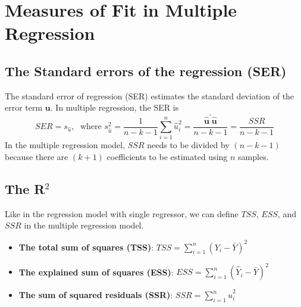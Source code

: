 \documentclass[a4paper,11pt]{article}
\begin{document}
\section{Measures of Fit in Multiple Regression}
\label{sec:org6b35845}
\subsection{The Standard errors of the regression (SER)}
\label{sec:orgfeeff00}
The standard error
of regression (SER) estimates the standard deviation of the error term
\(\mathbf{u}\). In multiple regression, the SER is
\begin{equation}
\label{eq:ser-m}
SER = s_{\hat{u}},\; \text{ where } s^2_{\hat{u}} = \frac{1}{n-k-1} \sum_{i=1}^n \hat{u}_i^2 =\frac{\mathbf{\hat{u}}^{\prime} \mathbf{\hat{u}}}{n-k-1} = \frac{SSR}{n-k-1}
\end{equation}
In the multiple regression model, \(SSR\) needs to be divided by
\((n-k-1)\) because there are \((k+1)\) coefficients to be estimated using
\(n\) samples.

\subsection{The R\(^{\text{2}}\)}
\label{sec:org89142d5}
Like in the regression model with single regressor, we can define
\(TSS\), \(ESS\), and \(SSR\) in the multiple regression model.

\begin{itemize}
\item \textbf{The total sum of squares (TSS)}: \(TSS = \sum_{i=1}^n (Y_i - \bar{Y})^2\)
\item \textbf{The explained sum of squares (ESS)}: \(ESS = \sum_{i=1}^n (\hat{Y}_i - \bar{Y})^2\)
\item \textbf{The sum of squared residuals (SSR)}: \(SSR = \sum_{i=1}^n \hat{u}_i^2\)
\end{itemize}
\end{document}
